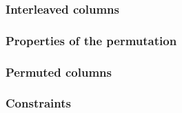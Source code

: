 \subsubsection{Interleaved columns}              \label{hub: consistencies: stack: interleavings}      
\subsubsection{Properties of the permutation}    \label{hub: consistencies: stack: permutation}        
\subsubsection{Permuted columns}                 \label{hub: consistencies: stack: columns}            
\subsubsection{Constraints}                      \label{hub: consistencies: stack: constraints}        

